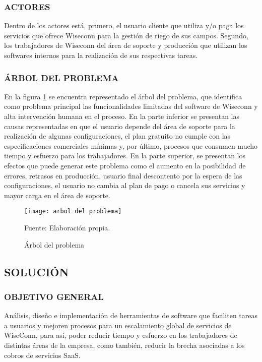 \subsubsection{ACTORES}
Dentro de los actores está, primero, el usuario cliente que utiliza y/o paga los servicios que ofrece Wiseconn para la gestión de riego de sus campos. Segundo, los trabajadores de Wiseconn del área de soporte y producción que utilizan los softwares internos para la realización de sus respectivas tareas.

\subsubsection{ÁRBOL DEL PROBLEMA}
En la figura \ref{fig:arbolproblema} se encuentra representado el árbol del problema, que identifica como problema principal las funcionalidades limitadas del software de Wiseconn y alta intervención humana en el proceso.
En la parte inferior se presentan las causas representadas en que el usuario depende del área de soporte para la realización de algunas configuraciones, el plan gratuito no cumple con las especificaciones comerciales mínimas y, por último, procesos que consumen mucho tiempo y esfuerzo para los trabajadores.
En la parte superior, se presentan los efectos que puede generar este problema como el aumento en la posibilidad de errores, retrasos en producción, usuario final descontento por la espera de las configuraciones, el usuario no cambia al plan de pago o cancela sus servicios y mayor carga en el área de soporte.

\begin{figure}
    \centering
	\texttt{[image: arbol del problema]}
	\caption{\label{fig:arbolproblema} Árbol del problema} Fuente: Elaboración propia.
\end{figure}

\subsection{SOLUCIÓN}

\subsubsection{OBJETIVO GENERAL}

Análisis, diseño e implementación de herramientas de software que faciliten tareas a usuarios y mejoren procesos para un escalamiento global de servicios de WiseConn, para así, poder reducir tiempo y esfuerzo en los trabajadores de distintas áreas de la empresa, como también, reducir la brecha asociadas a los cobros de servicios SaaS.

